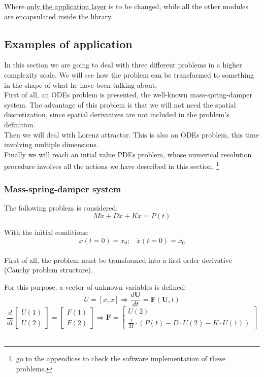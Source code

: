 Where \underline{only the application layer} is to be changed, while all the
other modules are encapsulated inside the library. \\


\newpage
\subsection{Examples of application}

In this section we are going to deal with three different problems in a higher
complexity scale. We will see how the problem can be transformed to something
in the shape of what he have been talking about.\\

 First of all, an ODEs problem is presented, the well-known
mass-spring-damper system. The advantage of this problem is that we will not
need the spatial discretization, since spatial derivatives are not included in
the problem's definition.\\

Then we will deal with Lorenz attractor. This is also an ODEs problem, this
time involving multiple dimensions.\\

Finally we will reach an intial value PDEs problem, whose numerical
resolution procedure involves all the actions we have described in this
section. \footnote{go to the appendices to check the software implementation
of these problems.}\\

\subsubsection*{Mass-spring-damper system}

The following problem is considered:
$$
M \ddot x + D \dot x + K x = P(t)
$$

With the initial conditions: 
$$
x(t=0)=x_0; \;\;\; \dot x (t=0)= \dot x_0
$$\\

First of all, the problem must be transformed into a first order derivative
(Cauchy problem structure).

For this purpose, a vector of unknown variables is defined:
$$
U=[x,  \dot x] \Longrightarrow \frac{d \mathbf{U}}{dt}= \mathbf{F}(\mathbf{U},t)
$$
$$
\frac{d}{dt}\begin{bmatrix}
U(1)\\
U(2)
\end{bmatrix}= 
\begin{bmatrix}
F(1)\\
F(2)
\end{bmatrix}
\Longrightarrow \mathbf{F}=\begin{bmatrix}
U(2)\\
\frac{1}{M}\cdot (P(t)-D\cdot U(2)-K \cdot U(1))
\end{bmatrix} 
$$\\

